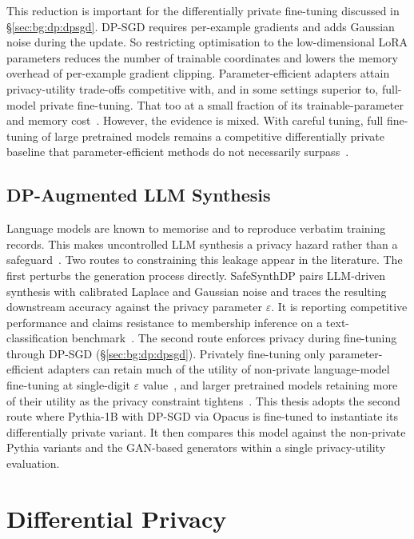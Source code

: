 This reduction is important for the differentially private fine-tuning
discussed in \S\ref{sec:bg:dp:dpsgd}. DP-SGD requires per-example 
gradients and adds Gaussian noise during
the update. So restricting optimisation to the low-dimensional LoRA parameters
reduces the number of trainable coordinates and lowers the memory overhead of
per-example gradient clipping. Parameter-efficient adapters attain privacy-utility
trade-offs competitive with, and in some settings superior to, full-model
private fine-tuning. That too at a small fraction of its trainable-parameter and memory
cost~\cite{Yu2022DPFT}. However, the evidence is mixed. With careful tuning,
full fine-tuning of large pretrained models remains a competitive differentially
private baseline that parameter-efficient methods do not necessarily
surpass~\cite{Li2022LargeDP}.

\subsection{DP-Augmented LLM Synthesis}
\label{sec:bg:llm:dp}

Language models are known to memorise and to
reproduce verbatim training records. This makes uncontrolled LLM synthesis a
privacy hazard rather than a safeguard~\cite{Carlini2021Extracting}. Two
routes to constraining this leakage appear in the literature. The first
perturbs the generation process directly. SafeSynthDP pairs LLM-driven
synthesis with calibrated Laplace and Gaussian noise and traces the resulting
downstream accuracy against the privacy parameter $\varepsilon$. It is reporting
competitive performance and claims resistance to membership inference on a
text-classification benchmark~\cite{Nahid2024}. The second
route enforces privacy during fine-tuning through DP-SGD
(\S\ref{sec:bg:dp:dpsgd}). Privately fine-tuning only 
parameter-efficient adapters can retain much of the utility of 
non-private language-model fine-tuning at single-digit $\varepsilon$ value~\cite{Yu2022DPFT}, 
and larger pretrained models retaining more of
their utility as the privacy constraint tightens~\cite{Li2022LargeDP}. This 
thesis adopts the second route where Pythia-1B with DP-SGD via Opacus is fine-tuned
to instantiate its differentially private variant. It then compares this model 
against the non-private Pythia variants and the GAN-based generators within a 
single privacy-utility evaluation.

\section{Differential Privacy}
\label{sec:bg:dp}

